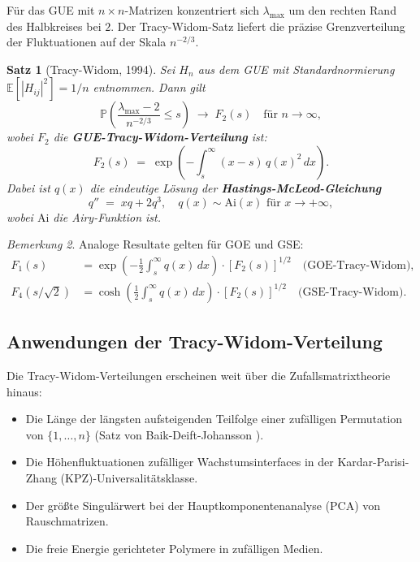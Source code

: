 \documentclass[12pt,a4paper]{amsart}
\newtheorem{theorem}{Satz}[section]
\theoremstyle{definition}
\theoremstyle{remark}
\newtheorem{bemerkung}[theorem]{Bemerkung}
\begin{document}
Für das GUE mit $n \times n$-Matrizen konzentriert sich $\lambda_{\max}$
um den rechten Rand des Halbkreises bei $2$. Der Tracy-Widom-Satz liefert
die präzise Grenzverteilung der Fluktuationen auf der Skala $n^{-2/3}$.

\begin{theorem}[Tracy-Widom, 1994]
\label{thm:tracywidom}
Sei $H_n$ aus dem GUE mit Standardnormierung
$\mathbb{E}[|H_{ij}|^2] = 1/n$ entnommen. Dann gilt
\[
  \mathbb{P}\!\left(\frac{\lambda_{\max} - 2}{n^{-2/3}} \leq s\right)
  \;\longrightarrow\; F_2(s) \quad \text{für } n \to \infty,
\]
wobei $F_2$ die \textbf{GUE-Tracy-Widom-Verteilung} ist:
\[
  F_2(s) \;=\; \exp\!\left(-\int_s^\infty (x-s)\,q(x)^2\,dx\right).
\]
Dabei ist $q(x)$ die eindeutige Lösung der \textbf{Hastings-McLeod-Gleichung}
\[
  q'' \;=\; xq + 2q^3, \quad q(x) \sim \mathrm{Ai}(x) \text{ für } x \to +\infty,
\]
wobei $\mathrm{Ai}$ die Airy-Funktion ist.
\end{theorem}

\begin{bemerkung}
Analoge Resultate gelten für GOE und GSE:
\begin{align*}
  F_1(s) &= \exp\!\left(-\frac{1}{2}\int_s^\infty q(x)\,dx\right)\cdot [F_2(s)]^{1/2}
  \quad \text{(GOE-Tracy-Widom)},\\
  F_4(s/\sqrt{2}) &= \cosh\!\left(\frac{1}{2}\int_s^\infty q(x)\,dx\right)\cdot [F_2(s)]^{1/2}
  \quad \text{(GSE-Tracy-Widom)}.
\end{align*}
\end{bemerkung}

\subsection{Anwendungen der Tracy-Widom-Verteilung}

Die Tracy-Widom-Verteilungen erscheinen weit über die Zufallsmatrixtheorie hinaus:
\begin{itemize}
  \item Die Länge der längsten aufsteigenden Teilfolge einer zufälligen
    Permutation von $\{1,\ldots,n\}$ (Satz von Baik-Deift-Johansson \cite{BaikDeiftJohansson1999}).
  \item Die Höhenfluktuationen zufälliger Wachstumsinterfaces in der
    Kardar-Parisi-Zhang (KPZ)-Universalitätsklasse.
  \item Der größte Singulärwert bei der Hauptkomponentenanalyse (PCA)
    von Rauschmatrizen.
  \item Die freie Energie gerichteter Polymere in zufälligen Medien.
\end{itemize}
\end{document}
